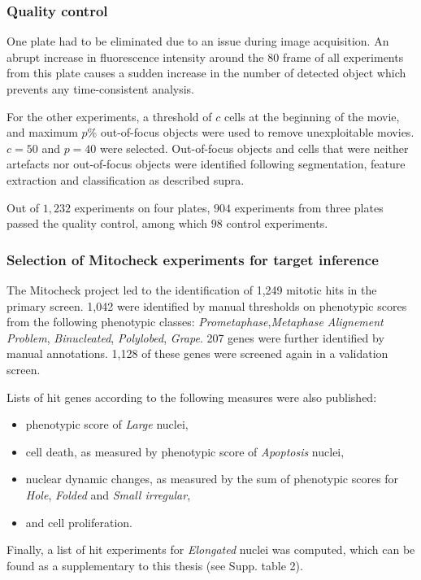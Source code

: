 \subsubsection{Quality control}
One plate had to be eliminated due to an issue during image acquisition. An abrupt increase in fluorescence intensity around the 80 frame of all experiments from this plate causes a sudden increase in the number of detected object which prevents any time-consistent analysis.

For the other experiments, a threshold of $c$ cells at the beginning of the movie, and maximum $p$\% out-of-focus objects were used to remove unexploitable movies. $c=50$ and $p=40$ were selected. Out-of-focus objects and cells that were neither artefacts nor out-of-focus objects were identified following segmentation, feature extraction and classification as described supra.

Out of $1,232$ experiments on four plates, $904$ experiments from three plates passed the quality control, among which $98$ control experiments.

\subsubsection{Selection of Mitocheck experiments for target inference}
\label{sec:selection_mitocheck}
The Mitocheck project led to the identification of 1,249 mitotic hits in the primary screen. 1,042 were identified by manual thresholds on phenotypic scores from the following phenotypic classes: \textit{Prometaphase},\textit{Metaphase Alignement Problem}, \textit{Binucleated}, \textit{Polylobed}, \textit{Grape}. 207 genes were further identified by manual annotations. 1,128 of these genes were screened again in a validation screen.

Lists of hit genes according to the following measures were also published:
\begin{itemize}
\item phenotypic score of \textit{Large} nuclei,
\item cell death, as measured by phenotypic score of \textit{Apoptosis} nuclei,
\item nuclear dynamic changes, as measured by the sum of phenotypic scores for \textit{Hole}, \textit{Folded} and \textit{Small irregular},
\item and cell proliferation.
\end{itemize}

Finally, a list of hit experiments for \textit{Elongated} nuclei was computed, which can be found as a supplementary to this thesis (see Supp. table 2).

